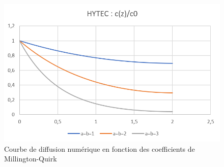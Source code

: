 \documentclass{article}
\begin{document}
\begin{figure}[H]
    \centering
    \includegraphics[height = 0.4 \textheight]{III_C_10.png}
    \caption{Courbe de diffusion numérique en fonction des coefficients de Millington-Quirk}
    \label{fig:sens_hytec_mq}
\end{figure}
\end{document}
